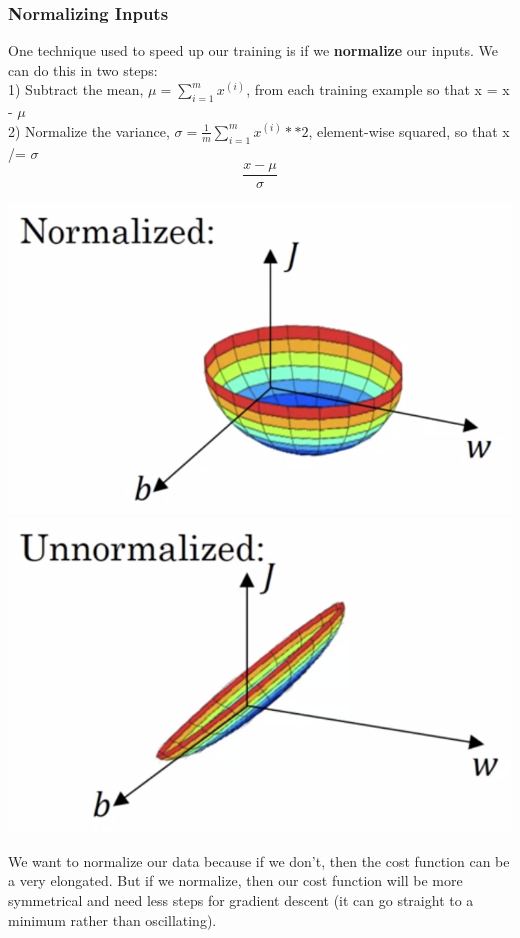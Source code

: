 \documentclass[11pt, a4paper]{article}
\begin{document}
\begin{spacing}{1.1}
	\subsubsection{Normalizing Inputs}
	One technique used to speed up our training is if we \textbf{normalize} our inputs. We can do this in two steps:\vspace*{.5mm} \\
	\hspace*{3mm} 1) Subtract the mean, $\mu = \sum_{i=1}^{m} x^{(i)}$, from each training example so that x = x - $\mu$ \\
	\hspace*{3mm} 2) Normalize the variance, $\sigma = \frac{1}{m} \sum_{i=1}^{m} x^{(i)} ** 2 $, element-wise squared, so that x /= $\sigma$ \\ $$ \frac{x- \mu}{\sigma} $$
	\begin{center} \includegraphics[scale=.35]{normalized_in} \hspace*{10mm} \includegraphics[scale=.35]{unnormalized_in} \end{center}
	We want to normalize our data because if we don't, then the cost function can be a very elongated. But if we normalize, then our cost function will be more symmetrical and need less steps for gradient descent (it can go straight to a minimum rather than oscillating). 

\end{spacing}
\end{document}
